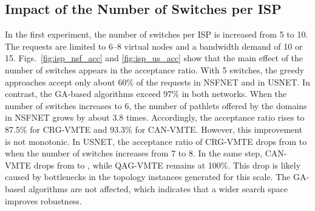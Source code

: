 %
%

\subsection{Impact of the Number of Switches per ISP}
\label{subsec:isp}

In the first experiment, the number of switches per ISP is increased from 5 to 10. The requests are limited to 6--8 virtual nodes and a bandwidth demand of 10 or 15.  Figs.~\ref{fig:isp_nsf_acc} and \ref{fig:isp_us_acc} show that the main effect of the number of switches appears in the acceptance ratio. With 5 switches, the greedy approaches accept only about 60\% of the requests in NSFNET and  in USNET. In contrast, the GA-based algorithms exceed 97\% in both networks. When the number of switches increases to 6, the number of pathlets offered by the domains in NSFNET grows by about 3.8 times. Accordingly, the acceptance ratio rises to 87.5\% for CRG-VMTE and 93.3\% for CAN-VMTE. However, this improvement is not monotonic. In USNET, the acceptance ratio of CRG-VMTE drops from  to  when the number of switches increases from 7 to 8. In the same step, CAN-VMTE drops from  to , while QAG-VMTE remains at 100\%.  This drop is likely caused by bottlenecks in the topology instances generated for this scale. The GA-based algorithms are not affected, which indicates that a wider search space improves robustness.

